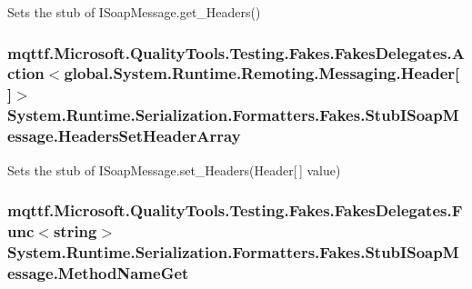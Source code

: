 Sets the stub of I\-Soap\-Message.\-get\-\_\-\-Headers()

\hypertarget{class_system_1_1_runtime_1_1_serialization_1_1_formatters_1_1_fakes_1_1_stub_i_soap_message_a6ead091454c42773b51d4652468d9f5a}{
\subsubsection[{Headers\-Set\-Header\-Array}]{\setlength{\rightskip}{0pt plus 5cm}mqttf.\-Microsoft.\-Quality\-Tools.\-Testing.\-Fakes.\-Fakes\-Delegates.\-Action$<$global.\-System.\-Runtime.\-Remoting.\-Messaging.\-Header\mbox{[}$\,$\mbox{]}$>$ System.\-Runtime.\-Serialization.\-Formatters.\-Fakes.\-Stub\-I\-Soap\-Message.\-Headers\-Set\-Header\-Array}}\label{class_system_1_1_runtime_1_1_serialization_1_1_formatters_1_1_fakes_1_1_stub_i_soap_message_a6ead091454c42773b51d4652468d9f5a}


Sets the stub of I\-Soap\-Message.\-set\-\_\-\-Headers(\-Header\mbox{[}$\,$\mbox{]} value)

\hypertarget{class_system_1_1_runtime_1_1_serialization_1_1_formatters_1_1_fakes_1_1_stub_i_soap_message_a4ec3546e803b7c47f07794f61601fd71}{
\subsubsection[{Method\-Name\-Get}]{\setlength{\rightskip}{0pt plus 5cm}mqttf.\-Microsoft.\-Quality\-Tools.\-Testing.\-Fakes.\-Fakes\-Delegates.\-Func$<$string$>$ System.\-Runtime.\-Serialization.\-Formatters.\-Fakes.\-Stub\-I\-Soap\-Message.\-Method\-Name\-Get}}\label{class_system_1_1_runtime_1_1_serialization_1_1_formatters_1_1_fakes_1_1_stub_i_soap_message_a4ec3546e803b7c47f07794f61601fd71}


